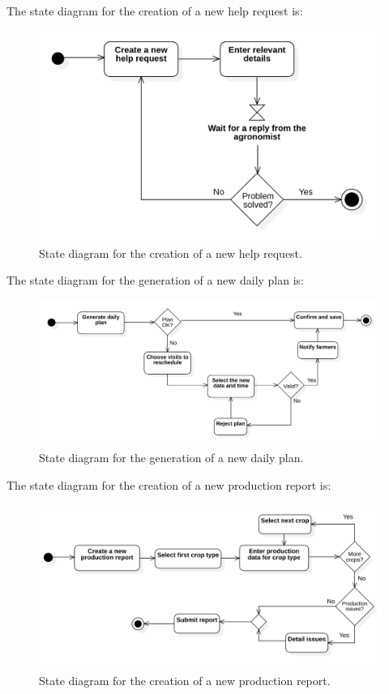 \documentclass{article}
\begin{document}
The state diagram for the creation of a new help request is:
\begin{figure}[H]
    \centering
	\includegraphics[scale=0.35]{state_machine_diagrams/statediagram1.png}
    \caption{State diagram for the creation of a new help request.}
\end{figure}

The state diagram for the generation of a new daily plan is:
\begin{figure}[H]
    \centering
	\includegraphics[scale=0.35]{state_machine_diagrams/statediagram2.png}
    \caption{State diagram for the generation of a new daily plan.}
\end{figure}
The state diagram for the creation of a new production report is:
\begin{figure}[H]
    \centering
	\includegraphics[scale=0.35]{state_machine_diagrams/statediagram3.png}
    \caption{State diagram for the creation of a new production report.}
\end{figure}
\end{document}
